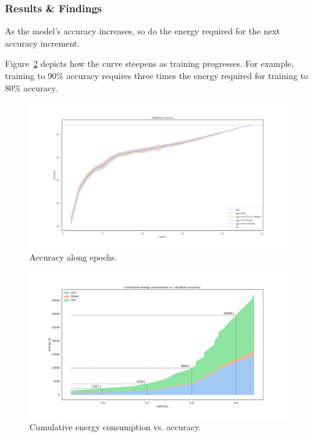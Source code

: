 \subsubsection{Results \& Findings}

As the model's accuracy increases, so do the energy required for the next accuracy increment.

Figure~\ref{fig:cum_energy_vs_accuracy} depicts how the curve steepens as training progresses.
For example, training to 90\% accuracy requires three times the energy required for training to 80\% accuracy.

\begin{figure}
    \centering
    \includegraphics[width=\linewidth]{imgs/accuracy_basedonepoch}
    \caption{Accuracy along epochs.}
    \label{fig:eopochvsaccuracy}
\end{figure}

\begin{figure}
    \centering
    \includegraphics[width=\linewidth]{imgs/cumulative_energy_vs_accuracy}
    \caption{Cumulative energy consumption vs. accuracy.}
    \label{fig:cum_energy_vs_accuracy}
\end{figure}

